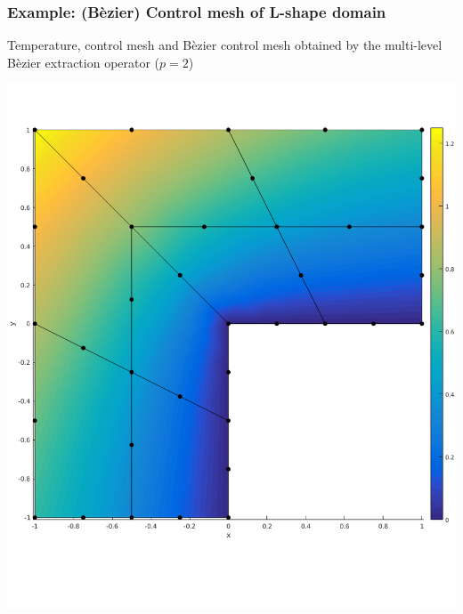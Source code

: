 \documentclass{beamer}
\begin{document}
\begin{frame}
	\frametitle{Example: (B\`ezier) Control mesh of L-shape domain}%
	Temperature, control mesh and B\`ezier control mesh obtained by the multi-level B\`ezier extraction operator ($ p=2 $)\\
	\centering
	\begin{minipage}{0.49\textwidth}
		\centering
	\includegraphics[scale=0.24]{pics/lshape/lshape_beziernet_1.png}
	\end{minipage}
	\begin{minipage}{0.49\textwidth}
			\centering

\end{minipage}
\end{frame}
\end{document}
